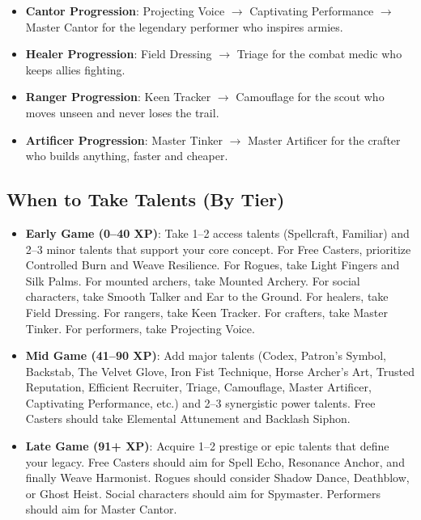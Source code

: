 \begin{itemize}
  \item \textbf{Cantor Progression}: Projecting Voice $\rightarrow$ Captivating Performance $\rightarrow$ Master Cantor for the legendary performer who inspires armies.
  \item \textbf{Healer Progression}: Field Dressing $\rightarrow$ Triage for the combat medic who keeps allies fighting.
  \item \textbf{Ranger Progression}: Keen Tracker $\rightarrow$ Camouflage for the scout who moves unseen and never loses the trail.
  \item \textbf{Artificer Progression}: Master Tinker $\rightarrow$ Master Artificer for the crafter who builds anything, faster and cheaper.
\end{itemize}

\subsection*{When to Take Talents (By Tier)}
\label{sec:when-to-take-talents}
\begin{itemize}
  \item \textbf{Early Game (0--40 XP)}: Take 1--2 access talents (Spellcraft, Familiar) and 2--3 minor talents that support your core concept. For Free Casters, prioritize Controlled Burn and Weave Resilience. For Rogues, take Light Fingers and Silk Palms. For mounted archers, take Mounted Archery. For social characters, take Smooth Talker and Ear to the Ground. For healers, take Field Dressing. For rangers, take Keen Tracker. For crafters, take Master Tinker. For performers, take Projecting Voice.
  \item \textbf{Mid Game (41--90 XP)}: Add major talents (Codex, Patron's Symbol, Backstab, The Velvet Glove, Iron Fist Technique, Horse Archer's Art, Trusted Reputation, Efficient Recruiter, Triage, Camouflage, Master Artificer, Captivating Performance, etc.) and 2--3 synergistic power talents. Free Casters should take Elemental Attunement and Backlash Siphon.
  \item \textbf{Late Game (91+ XP)}: Acquire 1--2 prestige or epic talents that define your legacy. Free Casters should aim for Spell Echo, Resonance Anchor, and finally Weave Harmonist. Rogues should consider Shadow Dance, Deathblow, or Ghost Heist. Social characters should aim for Spymaster. Performers should aim for Master Cantor.
\end{itemize}

